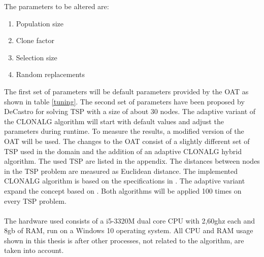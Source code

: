 The parameters to be altered are:
\begin{enumerate}
	\item 	Population size
	\item 	Clone factor
	\item 	Selection size
	\item 	Random replacements	
\end{enumerate}
The first set of parameters will be default parameters provided by the OAT as shown in table \ref{tuning}. The second set of parameters have been proposed by DeCastro \cite{DEC02} for solving TSP with a size of about 30 nodes.
The adaptive variant of the CLONALG algorithm will start with default values and adjust the parameters during runtime.
To measure the results, a modified version of the OAT will be used. The changes to the OAT consist of a slightly different set of TSP used in the domain and the addition of an adaptive CLONALG hybrid algorithm. The used TSP are listed in the appendix. The distances between nodes in the TSP problem are measured as Euclidean distance. The implemented CLONALG algorithm is based on the specifications in \cite{DEC02}. The adaptive variant expand the concept based on \cite{Garret04}.
Both algorithms will be applied 100 times on every TSP problem.\\\\
The hardware used consists of a i5-3320M dual core CPU with 2,60ghz each and 8gb of RAM, run on a Windows 10 operating system. All CPU and RAM usage shown in this thesis is after other processes, not related to the algorithm, are taken into account.
